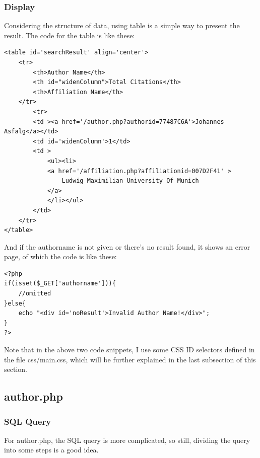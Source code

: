 \documentclass[a4paper]{article}
\begin{document}
            \subsubsection{Display}
Considering the structure of data, using table is a simple way to present the result. The code for the table is like these:
            \begin{verbatim}
<table id='searchResult' align='center'>
    <tr>
        <th>Author Name</th>
        <th id="widenColumn">Total Citations</th>
        <th>Affiliation Name</th>
    </tr>
        <tr>
        <td ><a href='/author.php?authorid=77487C6A'>Johannes Asfalg</a></td>
        <td id='widenColumn'>1</td>
        <td >
            <ul><li>
            <a href='/affiliation.php?affiliationid=007D2F41' >
                Ludwig Maximilian University Of Munich
            </a>
            </li></ul>
        </td>
    </tr>
</table>
            \end{verbatim}
And if the authorname is not given or there's no result found, it shows an error page, of which the code is like these:
            \begin{verbatim}
<?php
if(isset($_GET['authorname'])){
    //omitted
}else{
    echo "<div id='noResult'>Invalid Author Name!</div>";
}
?>
            \end{verbatim}
Note that in the above two code snippets, I use some CSS ID selectors defined in the file css/main.css, which will be further explained in the last subsection of this section.
        \subsection{author.php}
            \subsubsection{SQL Query}
For author.php, the SQL query is more complicated, so still, dividing the query into some steps is a good idea.
\end{document}

